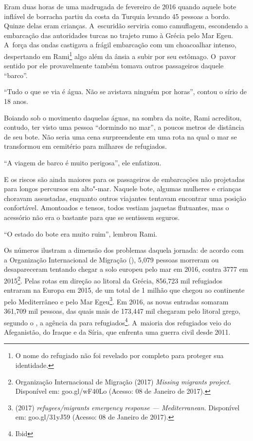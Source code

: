  
% 
% 
Eram duas horas de uma madrugada de fevereiro de 2016 quando aquele bote
inflável de borracha partiu da costa da Turquia levando 45 pessoas a
bordo. Quinze delas eram crianças. A~escuridão serviria como camuflagem,
escondendo a embarcação das autoridades turcas no trajeto rumo à Grécia
pelo Mar Egeu. A~força das ondas castigava a frágil embarcação com um
choacoalhar intenso, despertando em Rami\footnote{ O nome do refugiado não foi revelado por completo
para proteger sua identidade.}  algo além da ânsia a subir por seu estômago. O~pavor sentido por ele provavelmente
também tomava outros passageiros  daquele ``barco''.  



``Tudo o que se via é água. Não se avistava ninguém por horas'', contou o
sírio de 18 anos.

Boiando sob o movimento daquelas águas, na sombra da noite, Rami
acreditou, contudo, ter visto uma pessoa ``dormindo no mar'', a poucos
metros de distância de seu bote. Não seria uma cena surpreendente em uma
rota na qual o mar se transformou em cemitério para milhares de
refugiados.

``A viagem de barco é muito perigosa'', ele enfatizou.

E os riscos são ainda maiores para os passageiros de embarcações não
projetadas para longos percursos em alto"-mar. Naquele bote, algumas
mulheres e crianças choravam assustadas, enquanto outros viajantes
tentavam encontrar uma posição confortável. Amontoados e tensos, todos
vestiam jaquetas flutuantes, mas o acessório não era o bastante para que
se sentissem seguros.

``O estado do bote era muito ruim'', lembrou Rami.

Os números ilustram a dimensão dos problemas daquela jornada: de acordo
com a Organização Internacional de Migração (), 5,079 pessoas
morreram ou desapareceram tentando chegar a solo europeu pelo mar em
2016, contra 3777 em 2015\footnote{ Organização Internacional de Migração (2017)
\emph{Missing migrants project}. Disponível em:
{goo.gl/wF40Lo}
(Acesso: 08 de Janeiro de 2017).}. Pelas rotas em direção ao
litoral da Grécia, 856,723 mil refugiados entraram na Europa em 2015, de
um total de 1 milhão que chegou ao continente pelo Mediterrâneo e pelo
Mar Egeu\footnote{  (2017) \emph{ refugees/migrants emergency
response --- Mediterranean}. Disponível em:
goo.gl/31yJ59
(Acesso: 08 de Janeiro
de 2017).}. Em 2016, as novas entradas somaram 361,709
mil pessoas, das quais mais de 173,447 mil chegaram pelo litoral grego,
segundo o , a agência da  para refugiados\footnote{ Ibid}. A~maioria dos refugiados veio do Afeganistão,  do Iraque e da Síria, que enfrenta
uma guerra civil desde 2011.

